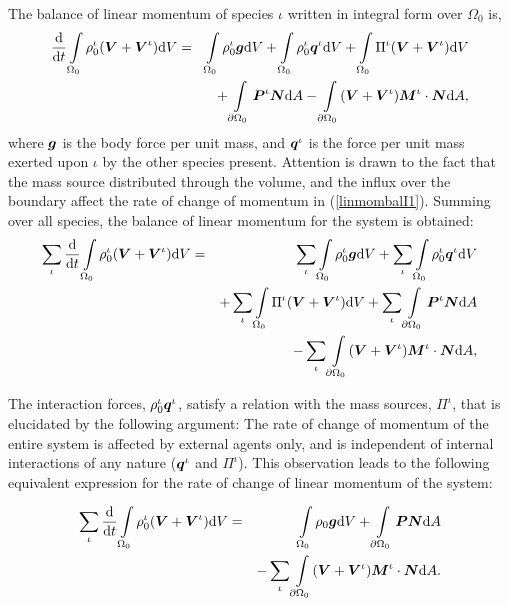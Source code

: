 The balance of linear momentum of species $\iota$ written in
integral form over $\Omega_0$ is,
\begin{eqnarray}
\frac{\mathrm{d}}{\mathrm{d}t} \int\limits_{\Omega_0}
\rho_0^\iota(\mbox{\boldmath$ V$}+\mbox{\boldmath$ V$}^\iota) \mathrm{d}V &=& \int\limits_{\Omega_0}
\rho^\iota_0\mbox{\boldmath$ g$} \mathrm{d}V + \int\limits_{\Omega_0}
\rho^\iota_0\mbox{\boldmath$ q$}^\iota \mathrm{d}V + \int\limits_{\Omega_0}
\Pi^\iota(\mbox{\boldmath$ V$}+\mbox{\boldmath$ V$}^\iota) \mathrm{d}V \nonumber\\
& &+ \int\limits_{\partial \Omega_0}\mbox{\boldmath$ P$}^\iota\mbox{\boldmath$ N$} \mathrm{d}A -
\int\limits_{\partial \Omega_0}(\mbox{\boldmath$ V$}+\mbox{\boldmath$ V$}^\iota)\mbox{\boldmath$ M$}^\iota\cdot\mbox{\boldmath$ N$}
\mathrm{d}A, \label{linmombalI1}
\end{eqnarray}
\noindent where $\mbox{\boldmath$ g$}$ is the body force per unit mass, and
$\mbox{\boldmath$ q$}^\iota$ is the force per unit mass exerted upon $\iota$ by the
other species present. Attention is drawn to the fact that the
mass source distributed through the volume, and the influx over
the boundary affect the rate of change of momentum in
(\ref{linmombalI1}). Summing over all species, the balance of
linear momentum for the system is obtained:
\begin{eqnarray}
\sum\limits_{\iota}\frac{\mathrm{d}}{\mathrm{d}t}
\int\limits_{\Omega_0} \rho_0^\iota(\mbox{\boldmath$ V$}+\mbox{\boldmath$ V$}^\iota) \mathrm{d}V &=&
\sum\limits_{\iota}\int\limits_{\Omega_0} \rho^\iota_0\mbox{\boldmath$ g$}
\mathrm{d}V + \sum\limits_{\iota}\int\limits_{\Omega_0}
\rho^\iota_0\mbox{\boldmath$ q$}^\iota \mathrm{d}V\nonumber\\& & +
\sum\limits_{\iota}\int\limits_{\Omega_0} \Pi^\iota(\mbox{\boldmath$ V$}+\mbox{\boldmath$ V$}^\iota)
\mathrm{d}V + \sum\limits_{\iota} \int\limits_{\partial
\Omega_0}\mbox{\boldmath$ P$}^\iota\mbox{\boldmath$ N$} \mathrm{d}A\nonumber\\
& & - \sum\limits_{\iota}\int\limits_{\partial
\Omega_0}(\mbox{\boldmath$ V$}+\mbox{\boldmath$ V$}^\iota)\mbox{\boldmath$ M$}^\iota\cdot\mbox{\boldmath$ N$} \mathrm{d}A,
\label{linmombalall}
\end{eqnarray}

The interaction forces, $\rho_0^\iota\mbox{\boldmath$ q$}^\iota$, satisfy a
relation with the mass sources, $\Pi^\iota$, that is elucidated by
the following argument: The rate of change of momentum of the
entire system is affected by external agents only, and is
independent of internal interactions of any nature ($\mbox{\boldmath$ q$}^\iota$
and $\Pi^\iota$). This observation leads to the following
equivalent expression for the rate of change of linear momentum of
the system:

\begin{eqnarray}
\sum\limits_{\iota}\frac{\mathrm{d}}{\mathrm{d}t}
\int\limits_{\Omega_0} \rho_0^\iota(\mbox{\boldmath$ V$}+\mbox{\boldmath$ V$}^\iota) \mathrm{d}V &=&
\int\limits_{\Omega_0}\rho_0\mbox{\boldmath$ g$} \mathrm{d}V +
\int\limits_{\partial \Omega_0}\mbox{\boldmath$ P$}\mbox{\boldmath$ N$} \mathrm{d}A \nonumber\\
& &- \sum\limits_{\iota}\int\limits_{\partial
\Omega_0}(\mbox{\boldmath$ V$}+\mbox{\boldmath$ V$}^\iota)\mbox{\boldmath$ M$}^\iota\cdot\mbox{\boldmath$ N$} \mathrm{d}A.
\label{linmombalsys}
\end{eqnarray}

